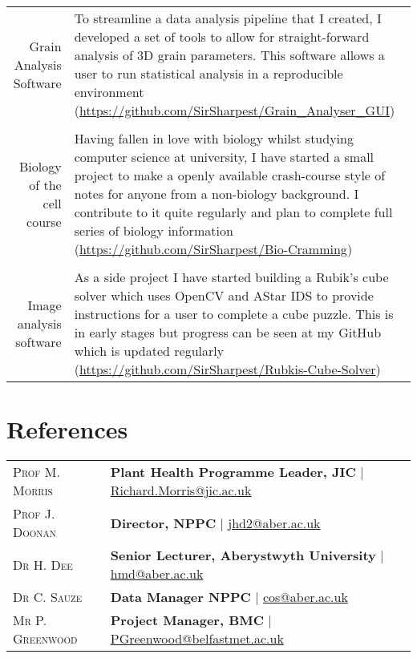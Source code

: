 \documentclass[a4paper,10pt]{article}
\begin{document}
\begin{tabular}{r|p{10cm}}

  Grain Analysis Software  & To streamline a data analysis pipeline that I created, I developed a set of tools to allow for straight-forward analysis of 3D grain parameters. This software allows a user to run statistical analysis in a reproducible environment (\href{https://github.com/SirSharpest/Grain\_Analyser\_GUI}{https://github.com/SirSharpest/Grain\_Analyser\_GUI})\\
\\
  Biology of the cell course & Having fallen in love with biology whilst studying computer science at university, I have started a small project to make a openly available crash-course style of notes for anyone from a non-biology background. I contribute to it quite regularly and plan to complete full series of biology information (\href{https://github.com/SirSharpest/Bio-Cramming}{https://github.com/SirSharpest/Bio-Cramming})\\
  \\
  Image analysis software& As a side project I have started building a Rubik's cube solver which uses OpenCV and AStar IDS to provide instructions for a user to complete a cube puzzle. This is in early stages but progress can be seen at my GitHub which is updated regularly (\href{https://github.com/SirSharpest/Rubkis-Cube-Solver}{https://github.com/SirSharpest/Rubkis-Cube-Solver})
\end{tabular}

\section{References}
\begin{tabular}{ll}
  \textsc{Prof M. Morris} & \textbf{Plant Health Programme Leader, JIC
} | \href{Richard.Morris@jic.ac.uk}{Richard.Morris@jic.ac.uk}
  \\
  \textsc{Prof J. Doonan} & \textbf{Director, NPPC} | \href{jhd2@aber.ac.uk}{jhd2@aber.ac.uk}
  \\
  \textsc{Dr H. Dee} & \textbf{Senior Lecturer, Aberystwyth University} | \href{hmd@aber.ac.uk}{hmd@aber.ac.uk}
  \\
  \textsc{Dr C. Sauze} & \textbf{Data Manager NPPC} | \href{cos@aber.ac.uk}{cos@aber.ac.uk}
\\
  \textsc{Mr P. Greenwood} & \textbf{Project Manager, BMC} | \href{PGreenwood@belfastmet.ac.uk}{PGreenwood@belfastmet.ac.uk}
  \\
\end{tabular}
\end{document}
